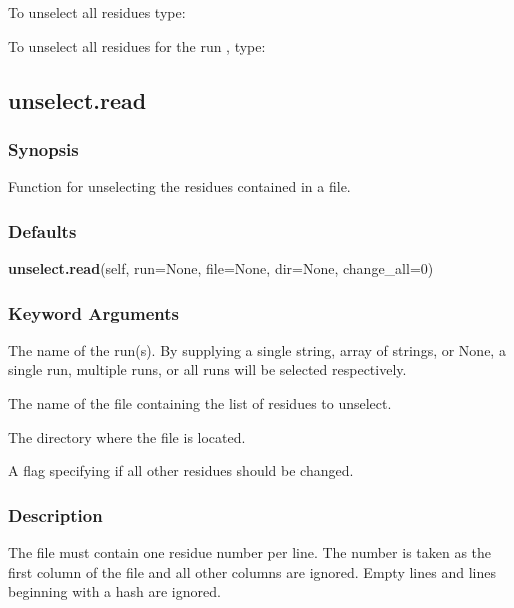 To unselect all residues type:




To unselect all residues for the run 
, type:





\newpage

\subsection{unselect.read}


\subsubsection{Synopsis}

Function for unselecting the residues contained in a file.

\subsubsection{Defaults}

\textsf{\textbf{unselect.read}(self, run=None, file=None, dir=None, change\_all=0)}


\subsubsection{Keyword Arguments}


  The name of the run(s).  By supplying a single string, array of strings, or None, a single run, multiple runs, or all runs will be selected respectively.

  The name of the file containing the list of residues to unselect.

  The directory where the file is located.

  A flag specifying if all other residues should be changed.

\subsubsection{Description}

The file must contain one residue number per line.  The number is taken as the first column
of the file and all other columns are ignored.  Empty lines and lines beginning with a hash
are ignored.

